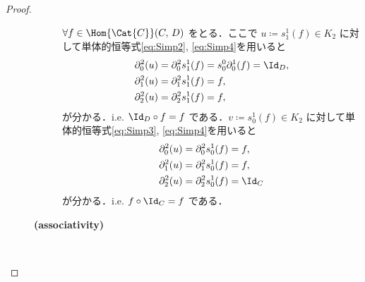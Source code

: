 \documentclass[TQFT_main]{subfiles}
\begin{document}
\begin{proof}
\begin{description}
\begin{description}
            $\forall f \in \Hom{\Cat{C}}(C,\, D)$ をとる．ここで $u \coloneqq s^1_1(f) \in K_2$ に対して単体的恒等式\eqref{eq:Simp2}, \eqref{eq:Simp4}を用いると
            \begin{align}
                \partial^2_0 (u) &= \partial^2_0 s^1_1 (f) = s^0_0 \partial^1_0(f) = \Id_D , \\
                \partial^2_1 (u) &= \partial^2_1 s^1_1 (f) = f, \\
                \partial^2_2 (u) &= \partial^2_2 s^1_1 (f) = f, \\
            \end{align}
            が分かる．i.e. $\Id_D \circ f = f$ である．$v \coloneqq s^1_0(f) \in K_2$ に対して単体的恒等式\eqref{eq:Simp3}, \eqref{eq:Simp4}を用いると
            \begin{align}
                \partial^2_0 (u) &= \partial^2_0 s^1_0 (f) = f, \\
                \partial^2_1 (u) &= \partial^2_1 s^1_0 (f) = f, \\
                \partial^2_2 (u) &= \partial^2_2 s^1_0 (f) = \Id_C
            \end{align}
            が分かる．i.e. $f \circ \Id_C = f$ である．

            \item[\textbf{(associativity)}]　
            

\end{description}
\end{description}
\end{proof}
\end{document}
